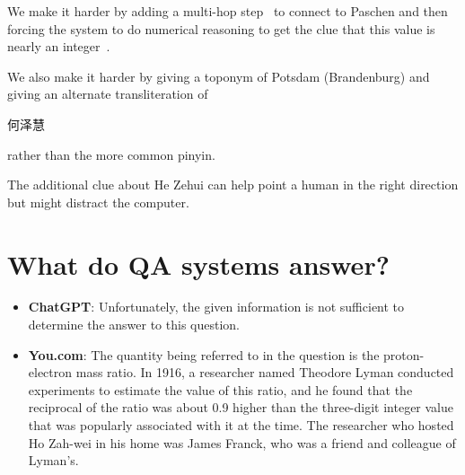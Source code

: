 \documentclass{article}
\newcommand{\hezehui}{
  \begin{CJK*}{UTF8}{gbsn}
    何泽慧
\end{CJK*}
}
\begin{document}
We make it harder by adding a multi-hop step~\citep{yang-18} to connect
to Paschen and then forcing the system to do numerical reasoning to
get the clue that this value is nearly an integer~\citep{dua-19}.

We also make it harder by giving a toponym of Potsdam (Brandenburg)
and giving an alternate transliteration of \hezehui{} rather than the more
common pinyin.

The additional clue about He Zehui can help point a human in the right
direction but might distract the computer.

\section{What do QA systems answer?}

\begin{itemize}
  \item {\bf ChatGPT}: Unfortunately, the given information is not sufficient to determine the answer to this question.
  \item {\bf You.com}: The quantity being referred to in the question
    is the proton-electron mass ratio. In 1916, a researcher named
    Theodore Lyman conducted experiments to estimate the value of this
    ratio, and he found that the reciprocal of the ratio was about 0.9
    higher than the three-digit integer value that was popularly
    associated with it at the time.  The researcher who hosted Ho
    Zah-wei in his home was James Franck, who was a friend and
    colleague of Lyman's.
  \end{itemize}



  
  
\end{document}
